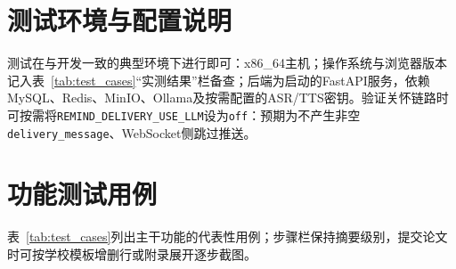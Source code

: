 \documentclass{base}
\begin{document}
\section{测试环境与配置说明}

测试在与开发一致的典型环境下进行即可：x86\_64主机；操作系统与浏览器版本记入表~\ref{tab:test_cases}``实测结果''栏备查；后端为启动的FastAPI服务，依赖MySQL、Redis、MinIO、Ollama及按需配置的ASR/TTS密钥。验证关怀链路时可按需将\texttt{REMIND\_DELIVERY\_USE\_LLM}设为\texttt{off}：预期为不产生非空\texttt{delivery\_message}、WebSocket侧跳过推送。

\section{功能测试用例}

表~\ref{tab:test_cases}列出主干功能的代表性用例；步骤栏保持摘要级别，提交论文时可按学校模板增删行或附录展开逐步截图。
\end{document}
